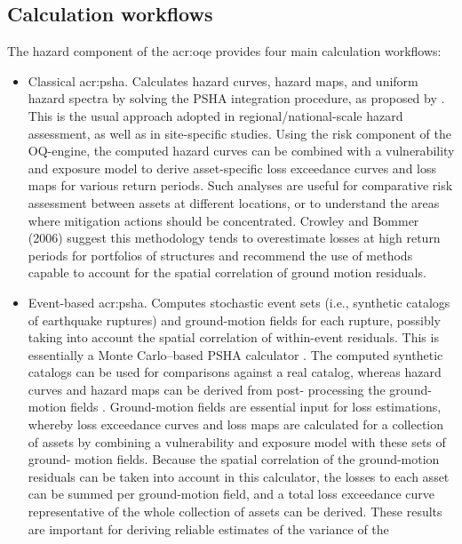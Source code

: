 \subsection{Calculation workflows}
The hazard component of the \gls{acr:oqe} provides four main calculation 
workflows:
\begin{itemize}
\item Classical \gls{acr:psha}. Calculates hazard curves, hazard maps, 
    and uniform hazard spectra by solving the PSHA integration procedure, 
    as proposed by \textcite{field2003}. 
    This is the usual approach adopted in regional/national-scale hazard 
    assessment, as well as in site-specific studies. Using the risk 
    component of the OQ-engine, the computed hazard curves can be 
    combined with a vulnerability and exposure model to derive 
    asset-specific loss exceedance curves and loss maps for various 
    return periods. Such analyses are useful for comparative risk 
    assessment between assets at different locations, or to understand
    the areas where mitigation actions should be concentrated. 
    Crowley and Bommer (2006) suggest this methodology tends to 
    overestimate losses at high return periods for portfolios of 
    structures and recommend the use of methods capable to account 
    for the spatial correlation of ground motion residuals.
\item Event-based \gls{acr:psha}. Computes stochastic event sets (i.e., 
    synthetic catalogs of earthquake ruptures) and ground-motion fields 
    for each rupture, possibly taking into account the spatial 
    correlation of within-event residuals. This is essentially a 
    Monte Carlo–based PSHA calculator \parencite{musson2000}. The computed 
    synthetic catalogs can be used for comparisons against a real 
    catalog, whereas hazard curves and hazard maps can be derived from 
    post- processing the ground-motion fields \parencite{ebel1999}. 
    Ground-motion fields are essential input for loss estimations, 
    whereby loss exceedance curves and loss maps are calculated for 
    a collection of assets by combining a vulnerability and exposure
    model with these sets of ground- motion fields. Because the spatial
    correlation of the ground-motion residuals can be taken into account
    in this calculator, the losses to each asset can be summed per 
    ground-motion field, and a total loss exceedance curve representative 
    of the whole collection of assets can be derived. These results are 
    important for deriving reliable estimates of the variance of the

\end{itemize}
